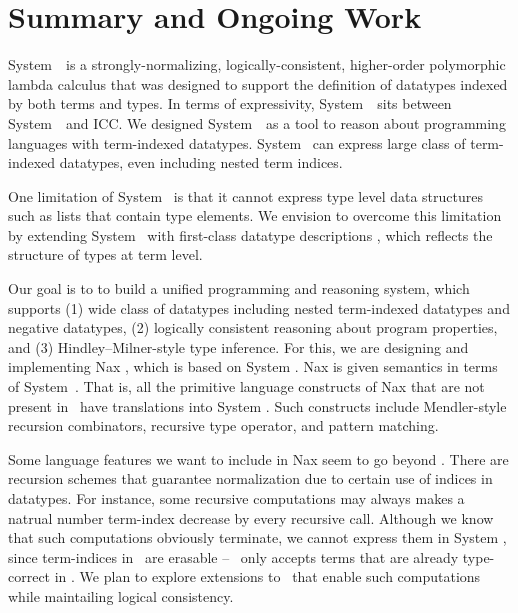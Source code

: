 \section{Summary and Ongoing Work} \label{sec:concl}
System~\Fi\ is a strongly-normalizing, logically-consistent, higher-order
polymorphic lambda calculus that was designed to support the
definition of datatypes indexed by both terms and types.
In terms of expressivity, System~\Fi\ sits between System~\Fw\ and ICC.
We designed System~\Fi\ as a tool to reason about programming
languages with term-indexed datatypes. System \Fi\ can express
large class of term-indexed datatypes, even including nested term
indices.

One limitation of System \Fi\ is that it cannot express type level
data structures such as lists that contain type elements.
We envision to overcome this limitation by extending System \Fi\ 
with first-class datatype descriptions \cite{DagMcb12}, which reflects
the structure of types at term level.

Our goal is to to build a unified programming and reasoning system,
which supports
(1) wide class of datatypes including nested term-indexed datatypes
and negative datatypes,
(2) logically consistent reasoning about program properties, and
(3) Hindley--Milner-style type inference.
For this, we are designing and implementing Nax \cite{AhnSheFioPit12},
which is based on System \Fi. Nax is given semantics in terms of System~\Fi.
That is, all the primitive language constructs of Nax that are not present
in \Fi\ have translations into System \Fi. Such constructs include
Mendler-style recursion combinators, recursive type operator, and
pattern matching.

Some language features we want to include in Nax seem to go beyond \Fi.
There are recursion schemes that guarantee normalization due to certain use
of indices in datatypes. For instance, some recursive computations may always
makes a natrual number term-index decrease by every recursive call.
Although we know that such computations obviously terminate, we cannot express
them in System \Fi, since term-indices in \Fi\ are erasable -- \Fi\ only
accepts terms that are already type-correct in \Fw.
We plan to explore extensions to \Fi\ that enable such computations
while maintailing logical consistency.

